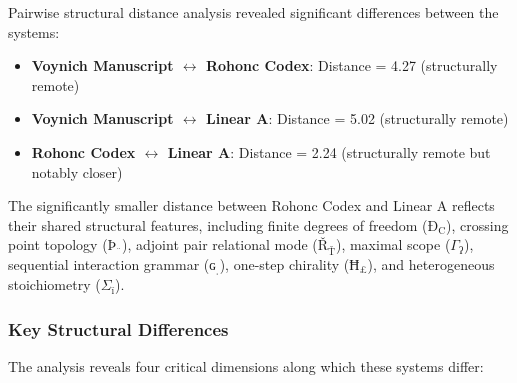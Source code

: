 \documentclass[12pt,a4paper]{article}
\begin{document}
Pairwise structural distance analysis revealed significant differences between the systems:

\begin{itemize}
    \item \textbf{Voynich Manuscript $\leftrightarrow$ Rohonc Codex}: Distance = 4.27 (structurally remote)
    \item \textbf{Voynich Manuscript $\leftrightarrow$ Linear A}: Distance = 5.02 (structurally remote)
    \item \textbf{Rohonc Codex $\leftrightarrow$ Linear A}: Distance = 2.24 (structurally remote but notably closer)
\end{itemize}

The significantly smaller distance between Rohonc Codex and Linear A reflects their shared structural features, including finite degrees of freedom ($\text{Ð}_{\text{C}}$), crossing point topology ($\text{Þ}_{\text{¨}}$), adjoint pair relational mode ($\text{Ř}_{\text{Ť}}$), maximal scope ($\Gamma_{\text{ʔ}}$), sequential interaction grammar ($\text{ɢ}_{\text{ˌ}}$), one-step chirality ($\text{Ħ}_{\text{£}}$), and heterogeneous stoichiometry ($\Sigma_{\text{ï}}$).

\subsubsection{Key Structural Differences}

The analysis reveals four critical dimensions along which these systems differ:
\end{document}

